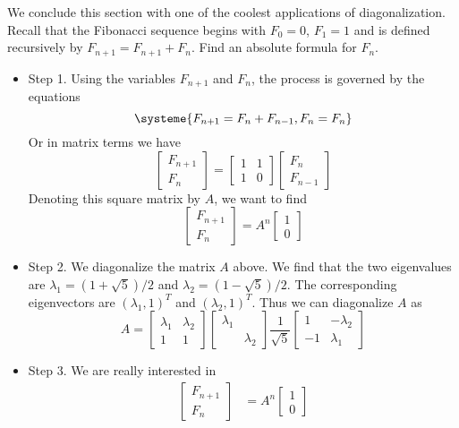 \documentclass[11pt,oneside]{amsbook}
\theoremstyle{definition}
\theoremstyle{plain}
\theoremstyle{definition}
\theoremstyle{remark}
\numberwithin{equation}{section}
\numberwithin{figure}{section}
\begin{document}
We conclude this section with one of the coolest applications of diagonalization. Recall that the Fibonacci sequence begins with $F_0=0$, $F_1=1$ and is defined recursively by $F_{n+1}=F_{n+1}+F_n$. Find an absolute formula for $F_n$.
\begin{itemize}
  \item Step 1. Using the variables $F_{n+1}$ and $F_n$, the process is governed by the equations
  \[\systeme{F_{n+1}=F_n+F_{n-1},F_n=F_n}
  \]
  Or in matrix terms we have
  \[\begin{bmatrix}F_{n+1}\\F_n\end{bmatrix}
    =\begin{bmatrix}1&1\\1&0\end{bmatrix}
    \begin{bmatrix}F_n\\F_{n-1}\end{bmatrix}
  \]
  Denoting this square matrix by $A$, we want to find
  \[\begin{bmatrix}F_{n+1}\\F_n\end{bmatrix}
    =A^n\begin{bmatrix}1\\0\end{bmatrix}
  \]
  \item Step 2. We diagonalize the matrix $A$ above. We find that the two eigenvalues are $\lambda_1=(1+\sqrt{5})/2$ and $\lambda_2=(1-\sqrt{5})/2$. The corresponding eigenvectors are $(\lambda_1,1)^T$ and $(\lambda_2,1)^T$. Thus we can diagonalize $A$ as
  \[A=\begin{bmatrix}\lambda_1&\lambda_2\\1&1\end{bmatrix}
    \begin{bmatrix}\lambda_1\\&\lambda_2\end{bmatrix}
    \frac{1}{\sqrt{5}}
    \begin{bmatrix}1&-\lambda_2\\-1&\lambda_1\end{bmatrix}
    \]
  \item Step 3. We are really interested in
  \begin{align*}
    \begin{bmatrix}F_{n+1}\\F_n\end{bmatrix}
    &=A^n\begin{bmatrix}1\\0\end{bmatrix}\\

\end{align*}
\end{itemize}
\end{document}
